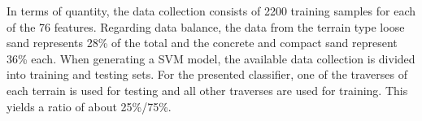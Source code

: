 In terms of quantity, the data collection consists of 2200 training samples for each of the 76 features. 
Regarding data balance, the data from the terrain type loose sand represents 28\% of the total and the concrete and compact sand represent 36\% each. 
When generating a SVM model, the available data collection is divided into training and testing sets. 
For the presented classifier, one of the traverses of each terrain is used for testing and all other traverses are used for training. 
This yields a ratio of about 25\%/75\%.